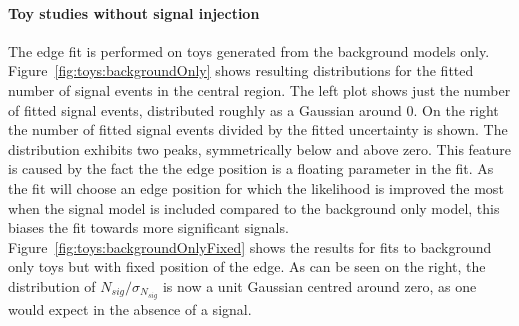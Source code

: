 \paragraph{Toy studies without signal injection}
The edge fit is performed on toys generated from the background models only. Figure~\ref{fig:toys:backgroundOnly} shows resulting distributions for the fitted number of signal events in the central region. The left plot shows just the number of fitted signal events, distributed roughly as a Gaussian around 0. On the right the number of fitted signal events divided by the fitted uncertainty is shown. The distribution exhibits two peaks, symmetrically below and above zero. This feature is caused by the fact the the edge position is a floating parameter in the fit. As the fit will choose an edge position for which the likelihood is improved the most when the signal model is included compared to the background only model, this biases the fit towards more significant signals. Figure~\ref{fig:toys:backgroundOnlyFixed} shows the results for fits to background only toys but with fixed position of the edge. As can be seen on the right, the distribution of $N_{sig}/\sigma_{N_{sig}}$ is now a unit Gaussian centred around zero, as one would expect in the absence of a signal. 
